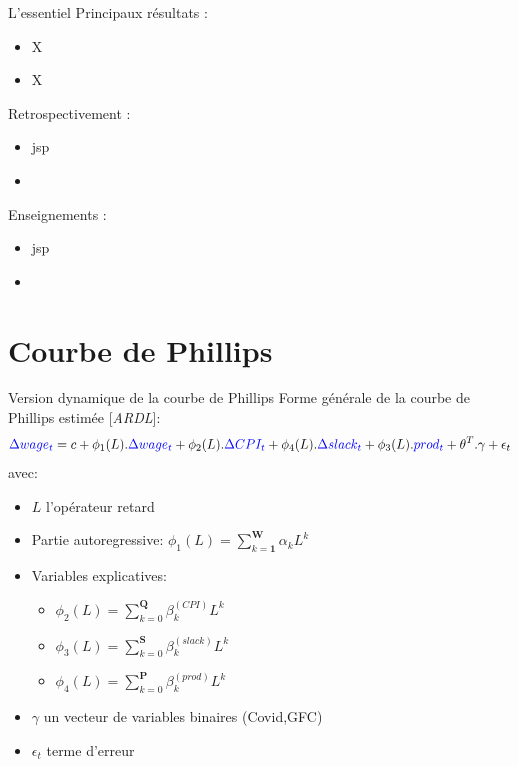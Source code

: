 \documentclass[9pt, xcolor={dvipsnames}]{beamer}
\newcommand{\blue}[1]{\textcolor{blue}{#1}}
\begin{document}
\begin{frame}{L'essentiel}
  Principaux résultats :
  \begin{itemize}
    \item X
    \item X
  \end{itemize}
  \vspace{.2cm}
  Retrospectivement :
  \begin{itemize}
    \item jsp
    \item 
  \end{itemize}
  \vspace{.2cm}
  Enseignements :
  \begin{itemize}
    \item jsp
    \item 
  \end{itemize}
\end{frame}

\section{Courbe de Phillips}
\begin{frame}[label=model]{Version dynamique de la courbe de Phillips}
  Forme générale de la courbe de Phillips estimée [\textit{ARDL}]:
  \begin{equation*}
    \blue{\Delta wage_{t}} = c + \phi_{1}(L).\blue{\Delta wage_{t}} + \phi_{2}(L).\blue{\Delta CPI_{t}} + \phi_{4}(L).\blue{\Delta slack_{t}} + \phi_{3}(L).\blue{prod_{t}} + \theta^{T}.\gamma + \epsilon_{t}
  \end{equation*}
  avec:
  \begin{itemize}
    \item $L$ l'opérateur retard
    \item Partie autoregressive: $\phi_{1}(L) = \sum_{k=\mathbf{1}}^{\mathbf{W}}\alpha_k L^{k}$ 
    \item Variables explicatives:
    \begin{itemize}
      \item $\phi_{2}(L) = \sum_{k=0}^{\mathbf{Q}}\beta_k^{(CPI)} L^{k}$
      \item $\phi_{3}(L) = \sum_{k=0}^{\mathbf{S}}\beta_k^{(slack)} L^{k}$
      \item $\phi_{4}(L) = \sum_{k=0}^{\mathbf{P}}\beta_k^{(prod)} L^{k}$
    \end{itemize}
    \item $\gamma$ un vecteur de variables binaires (Covid,GFC)
    \item $\epsilon_{t}$ terme d'erreur
  \end{itemize}
\end{frame}
\end{document}
